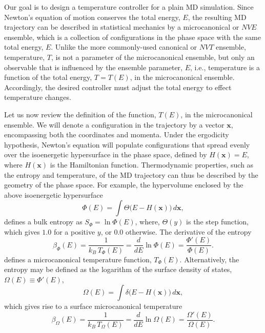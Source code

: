 \documentclass[reprint]{revtex4-1}
\begin{document}
Our goal is to design a temperature controller for a plain MD simulation.
%
Since Newton's equation of motion
conserves the total energy, $E$,
the resulting MD trajectory can be described in statistical mechanics
by a microcanonical or $NVE$ ensemble,
which is a collection of configurations in the phase space
with the same total energy, $E$.
%
Unlike the more commonly-used canonical or $NVT$ ensemble,
temperature, $T$, is not a parameter of the microcanonical ensemble,
but only an observable
that is influenced by the ensemble parameter, $E$,
i.e., temperature is a function of the total energy, $T = T(E)$,
in the microcanonical ensemble.
%
Accordingly, the desired controller must adjust the total energy
to effect temperature changes.


Let us now review the definition of the function, $T(E)$,
in the microcanonical ensemble.
%
We will denote a configuration in the trajectory
by a vector $\mathbf x$,
encompassing both the coordinates and momenta.
%
Under the ergodicity hypothesis,
Newton's equation will populate configurations
that spread evenly over
the isoenergetic hypersurface in the phase space,
defined by
$H(\mathbf x) = E$,
where $H(\mathbf x)$ is the Hamiltonian function.
%
Thermodynamic properties, such as the entropy and temperature,
of the MD trajectory
can thus be described by the geometry of the phase space.
%
For example, the hypervolume enclosed by the above isoenergetic hypersurface
%
\begin{equation}
  \Phi(E)
  =
  \int
    \Theta\bigl( E - H(\mathbf x) \bigr)
    \, d\mathbf x
  ,
  \label{eq:PhiE}
\end{equation}
%
defines a bulk entropy as $S_\Phi = \ln \Phi(E)$,
where, $\Theta(y)$ is the step function,
which gives $1.0$ for a positive $y$, or $0.0$ otherwise.
%
The derivative of the entropy
%
\begin{equation}
  \beta_\Phi(E)
  =
  \frac{1}{ k_B \, T_\Phi(E) }
  =
  \frac{ d }{ dE }
  \ln \Phi(E)
  =
  \frac{ \Phi'(E) }
       { \Phi(E)  }
  .
  \label{eq:betaE_def}
\end{equation}
%
defines a microcanonical temperature function, $T_\Phi(E)$.
%
Alternatively, the entropy may be defined
as the logarithm of the surface density of states,
$\Omega(E) \equiv \Phi'(E)$,
%
\begin{equation}
  \Omega(E)
  =
  \int
    \delta\bigl( E - H(\mathbf x) \bigr)
    \, d\mathbf x
  ,
  \label{eq:DOSE}
\end{equation}
%
which gives rise to a surface microcanonical temperature
%
\begin{equation}
  \beta_\Omega(E)
  =
  \frac{1}{ k_B \, T_\Omega(E) }
  =
  \frac{ d }{ dE }
  \ln \Omega(E)
  =
  \frac{ \Omega'(E) }
       { \Omega(E)  }
  .
  \label{eq:betaE_surf_def}
\end{equation}
\end{document}
